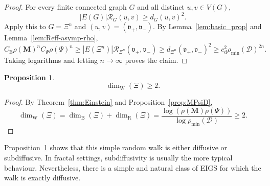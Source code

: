 \documentclass{article}
\theoremstyle{plain}
\theoremstyle{definition}
\newtheorem{proposition}[theorem]{Proposition}
\newcommand{\dist}{\mathrm{d}}
\newcommand{\Reff}{\mathscr{R}}
\newcommand{\dimbox}{\dim_\mathrm{B}}
\newcommand{\dimwalk}{\dim_\mathrm{W}}
\newcommand{\dimresis}{\dim_\mathrm{R}}
\begin{document}
\begin{proof}
For every finite connected graph $G$ and all distinct $u,v\in V(G)$,
\[
|E(G)|\Reff_G(u,v)\ge d_G(u,v)^2.
\]
Apply this to $G=\Xi^n$ and $(u,v)=(\mathfrak v_+,\mathfrak v_-)$.
By Lemma~\ref{lem:basic_prop} and Lemma~\ref{lem:Reff-asymp-rho},
\[
C_{\mathrm E}\rho(\mathbf M)^n C_{\Psi}\rho(\Psi)^n
\ge
|E(\Xi^n)|\Reff_{\Xi^n}(\mathfrak v_+,\mathfrak v_-)
\ge
d_{\Xi^n}(\mathfrak v_+,\mathfrak v_-)^2
\ge
c_{\dist}^2 \rho_{\min}(\mathcal D)^{2n}.
\]
Taking logarithms and letting $n\to\infty$ proves the claim.
\end{proof}

\begin{proposition}\label{prop:walk_dimension_ge_2}
\[
\dimwalk(\Xi)\ge 2.
\]
\end{proposition}

\begin{proof}
By Theorem~\ref{thm:Einstein} and Proposition~\ref{prop:MPsiD},
\[
\dimwalk(\Xi)
=
\dimbox(\Xi)+\dimresis(\Xi)
=
\frac{\log(\rho(\mathbf M)\rho(\Psi))}{\log \rho_{\min}(\mathcal D)}
\ge 2.
\]
\end{proof}

Proposition~\ref{prop:walk_dimension_ge_2} shows that this simple random walk is either diffusive or subdiffusive.
In fractal settings, subdiffusivity is usually the more typical behaviour.
Nevertheless, there is a simple and natural class of EIGS for which the walk is exactly diffusive.
\end{document}

